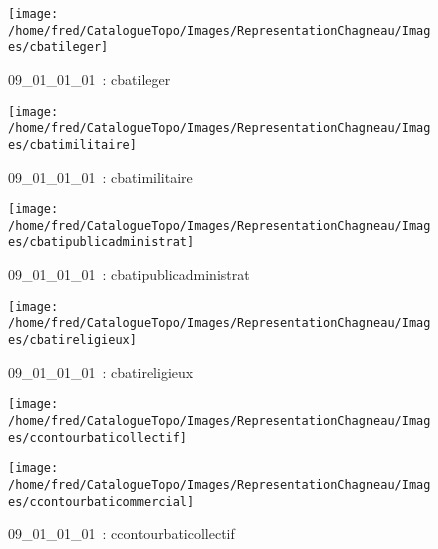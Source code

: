 \documentclass[12pt,titlepage]{book}
\begin{document}
\begin{figure}[h!]
\begin{minipage}[t]{3cm}
    \begin{center}
      \texttt{[image: /home/fred/CatalogueTopo/Images/RepresentationChagneau/Images/cbatileger]}
      \caption[~09\_01\_01\_01]{\small{09\_01\_01\_01~:} \tiny{cbatileger}}\label{cbatileger}
    \end{center}
  \end{minipage}
  \begin{minipage}[t]{3cm}
    \begin{center}
      \texttt{[image: /home/fred/CatalogueTopo/Images/RepresentationChagneau/Images/cbatimilitaire]}
      \caption[~09\_01\_01\_01]{\small{09\_01\_01\_01~:} \tiny{cbatimilitaire}}\label{cbatimilitaire}
    \end{center}
  \end{minipage}
  \begin{minipage}[t]{3cm}
    \begin{center}
      \texttt{[image: /home/fred/CatalogueTopo/Images/RepresentationChagneau/Images/cbatipublicadministrat]}
      \caption[~09\_01\_01\_01]{\small{09\_01\_01\_01~:} \tiny{cbatipublicadministrat}}\label{cbatipublicadministrat}
    \end{center}
  \end{minipage}
  \begin{minipage}[t]{3cm}
    \begin{center}
      \texttt{[image: /home/fred/CatalogueTopo/Images/RepresentationChagneau/Images/cbatireligieux]}
      \caption[~09\_01\_01\_01]{\small{09\_01\_01\_01~:} \tiny{cbatireligieux}}\label{cbatireligieux}
    \end{center}
  \end{minipage}
  \begin{minipage}[t]{3cm}
    \begin{center}
      \texttt{[image: /home/fred/CatalogueTopo/Images/RepresentationChagneau/Images/ccontourbaticollectif]}
      \caption[~09\_01\_01\_01]{\small{09\_01\_01\_01~:} \tiny{ccontourbaticollectif}}\label{ccontourbaticollectif}
    \end{center}
  \end{minipage}
  \begin{minipage}[t]{3cm}
    \begin{center}
      \texttt{[image: /home/fred/CatalogueTopo/Images/RepresentationChagneau/Images/ccontourbaticommercial]}

\end{center}
\end{minipage}
\end{figure}
\end{document}
